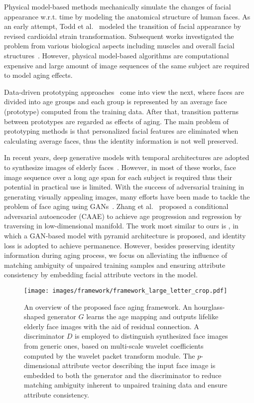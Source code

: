 \documentclass[letterpaper]{article} %
\begin{document}
Physical model-based methods mechanically simulate the changes of facial appearance w.r.t. time by modeling the anatomical structure of human faces. 
As an early attempt, Todd et al.~\cite{todd1980perception} modeled the transition of facial appearance by revised cardioidal strain transformation. 
Subsequent works investigated the problem from various biological aspects including muscles and overall facial structures~\cite{lanitis2002toward,tazoe2012facial}. However, physical model-based algorithms are computational expensive and large amount of image sequences of the same subject are required to model aging effects.

Data-driven prototyping approaches~\cite{suo2010compositional,tiddeman2001prototyping,kemelmacher2014illumination} come into view the next, where faces are divided into age groups and each group is represented by an average face (prototype) computed from the training data. After that, transition patterns between prototypes are regarded as effects of aging. 
The main problem of prototyping methods is that personalized facial features are eliminated when calculating average faces, thus the identity information is not well preserved. 

In recent years, deep generative models with temporal architectures are adopted to synthesize images of elderly faces~\cite{wang2016recurrent,duong2016longitudinal,duong2017temporal}. However, in most of these works, face image sequence over a long age span for each subject is required thus their potential in practical use is limited. 
With the success of adversarial training in generating visually appealing images, many efforts have been made to tackle the problem of face aging using GANs~\cite{goodfellow2014generative}. Zhang et al.~\cite{zhang2017age} proposed a conditional adversarial autoencoder (CAAE) to achieve age progression and regression by traversing in low-dimensional manifold. 
The work most similar to ours is \cite{yang2017learning}, in which a GAN-based model with pyramid architecture is proposed, and identity loss is adopted to achieve permanence. 
However, besides preserving identity information during aging process, we focus on alleviating the influence of matching ambiguity of unpaired training samples and ensuring attribute consistency by embedding facial attribute vectors in the model.

\begin{figure*}[ht]
\centering\texttt{[image: images/framework/framework\_large\_letter\_crop.pdf]}
\caption{An overview of the proposed face aging framework. An hourglass-shaped generator $G$ learns the age mapping and outputs lifelike elderly face images with the aid of residual connection. A discriminator $D$ is employed to distinguish synthesized face images from generic ones, based on multi-scale wavelet coefficients computed by the wavelet packet transform module. The $p$-dimensional attribute vector describing the input face image is embedded to both the generator and the discriminator to reduce matching ambiguity inherent to unpaired training data and ensure attribute consistency.}
\label{fig:overview}
\end{figure*}
\end{document}
